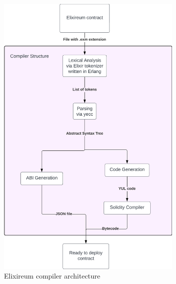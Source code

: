 \begin{figure}[h!]
    \centering
    \includegraphics[width=0.8\textwidth]{figs/arch.png}
    \caption{Elixireum compiler architecture}
    \label{fig:arch}
\end{figure}



